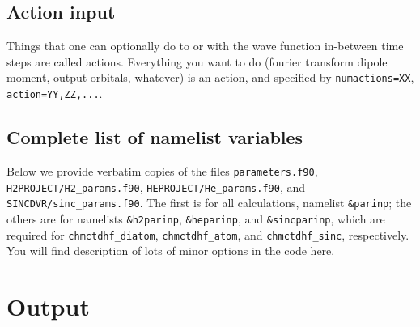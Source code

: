 \documentclass[10pt,leqno, oneside]{book}
\begin{document}

%

\section{Action input \label{actsection}}

Things that one can optionally do to or with the wave function in-between time steps are called actions.  Everything you want to
do (fourier transform dipole moment, output orbitals, whatever) is an action, and specified by \verb#numactions=XX#, 
\verb#action=YY,ZZ,...#.





\section{Complete list of namelist variables\label{varsect}}

Below we provide verbatim copies of the files \verb#parameters.f90#, \verb#H2PROJECT/H2_params.f90#, 
\verb#HEPROJECT/He_params.f90#, and \verb#SINCDVR/sinc_params.f90#.  
The first is for all calculations, namelist \verb#&parinp#; the others are for namelists
\verb#&h2parinp#, \verb#&heparinp#, and \verb#&sincparinp#, which are required for \verb#chmctdhf_diatom#, \verb#chmctdhf_atom#,
and \verb#chmctdhf_sinc#,
respectively.  You will find description of lots of minor options in the code here.

\newpage
{\footnotesize

%

%

%

}



\chapter{Output \label{outsection}}
\end{document}
